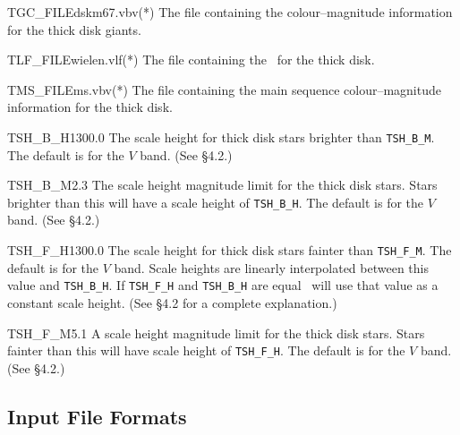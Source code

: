 \documentclass[11pt,twoside]{article}
\begin{document}
\begin{key}{TGC\_FILE}{dskm67.vbv}{(*)}
The file containing the colour--magnitude information for the thick disk 
giants.
\end{key}

\begin{key}{TLF\_FILE}{wielen.vlf}{(*)}
The file containing the \lf\ for the thick disk.
\end{key}

\begin{key}{TMS\_FILE}{ms.vbv}{(*)}
The file containing the main sequence colour--magnitude information for the 
thick disk.
\end{key}

\begin{key}{TSH\_B\_H}{1300.0}{}
The scale height for thick disk stars brighter than {\tt TSH\_B\_M}. The 
default is for the $V$ band. (See \S4.2.)
\end{key}

\begin{key}{TSH\_B\_M}{2.3}{}
The scale height magnitude limit for the thick disk stars. Stars brighter 
than this will have a scale height of {\tt TSH\_B\_H}. The default is for 
the $V$ band. (See \S4.2.)
\end{key}

\begin{key}{TSH\_F\_H}{1300.0}{}
The scale height for thick disk stars fainter than {\tt TSH\_F\_M}. The 
default is for the $V$ band. Scale heights are linearly interpolated between 
this value and {\tt TSH\_B\_H}. If {\tt TSH\_F\_H} and {\tt TSH\_B\_H} are 
equal \bsm\ will use that value as a constant scale height. (See \S4.2 for a 
complete explanation.)
\end{key}

\begin{key}{TSH\_F\_M}{5.1}{}
A scale height magnitude limit for the thick disk stars. Stars fainter than 
this will have scale height of {\tt TSH\_F\_H}. The default is for the $V$ 
band. (See \S4.2.)
\end{key}

\subsection{Input File Formats}
\end{document}
